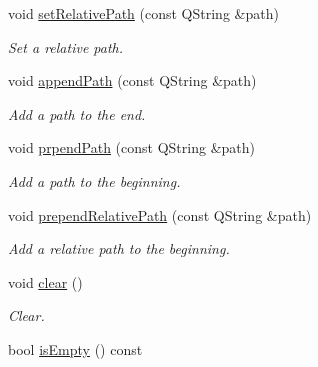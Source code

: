 \begin{DoxyCompactItemize}
\item 
void \hyperlink{class_mdt_1_1_deploy_utils_1_1_r_path_info_list_a5217a1f39d2e85f398a84973a137534d}{set\+Relative\+Path} (const Q\+String \&path)
\begin{DoxyCompactList}\small\item\em Set a relative path. \end{DoxyCompactList}\item 
void \hyperlink{class_mdt_1_1_deploy_utils_1_1_r_path_info_list_a4838fd8b2d20c9bb08e8a9b851eb3c99}{append\+Path} (const Q\+String \&path)
\begin{DoxyCompactList}\small\item\em Add a path to the end. \end{DoxyCompactList}\item 
void \hyperlink{class_mdt_1_1_deploy_utils_1_1_r_path_info_list_adc72ade2e8a37998fdbba4cc56b160cc}{prpend\+Path} (const Q\+String \&path)
\begin{DoxyCompactList}\small\item\em Add a path to the beginning. \end{DoxyCompactList}\item 
void \hyperlink{class_mdt_1_1_deploy_utils_1_1_r_path_info_list_ad947d47a73cb7996e9fb3acbca6fa5ac}{prepend\+Relative\+Path} (const Q\+String \&path)
\begin{DoxyCompactList}\small\item\em Add a relative path to the beginning. \end{DoxyCompactList}\item 
void \hyperlink{class_mdt_1_1_deploy_utils_1_1_r_path_info_list_a79581201672fa7832cf4239d5fe86160}{clear} ()\hypertarget{class_mdt_1_1_deploy_utils_1_1_r_path_info_list_a79581201672fa7832cf4239d5fe86160}{}\label{class_mdt_1_1_deploy_utils_1_1_r_path_info_list_a79581201672fa7832cf4239d5fe86160}

\begin{DoxyCompactList}\small\item\em Clear. \end{DoxyCompactList}\item 
bool \hyperlink{class_mdt_1_1_deploy_utils_1_1_r_path_info_list_a6aaab42f9bbae791596b2844ecef988f}{is\+Empty} () const \hypertarget{class_mdt_1_1_deploy_utils_1_1_r_path_info_list_a6aaab42f9bbae791596b2844ecef988f}{}\label{class_mdt_1_1_deploy_utils_1_1_r_path_info_list_a6aaab42f9bbae791596b2844ecef988f}


\end{DoxyCompactItemize}
